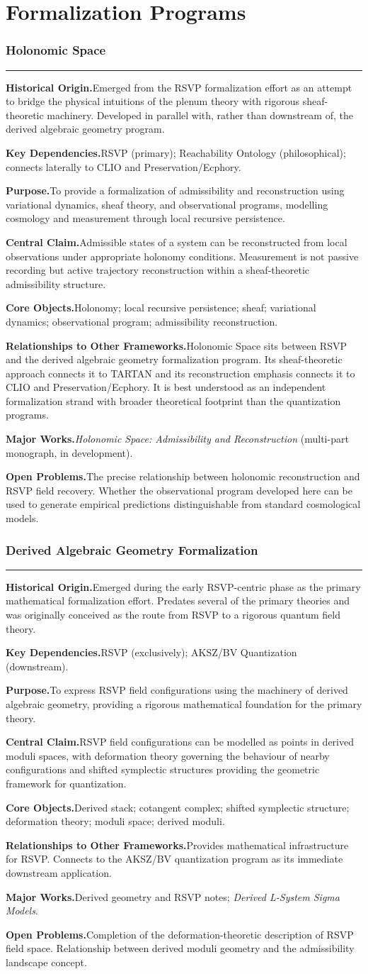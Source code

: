 \documentclass[12pt, twoside]{article}
\newcommand{\frameworkhead}[5]{  \subsubsection{#1}
  \noindent\textcolor{#2}{\rule{\linewidth}{0.8pt}}
  \smallskip

  \noindent\textbf{Historical Origin.}\quad #3

  \noindent\textbf{Key Dependencies.}\quad #4

  \noindent\textbf{Purpose.}\quad #5
}
\newcommand{\frameworkbody}[5]{  \noindent\textbf{Central Claim.}\quad #1

  \noindent\textbf{Core Objects.}\quad #2

  \noindent\textbf{Relationships to Other Frameworks.}\quad #3

  \noindent\textbf{Major Works.}\quad #4

  \noindent\textbf{Open Problems.}\quad #5
  \medskip
}
\begin{document}
\section{Formalization Programs}

\frameworkhead{Holonomic Space}{formalismgray}{Emerged from the RSVP formalization effort as an attempt to bridge the
physical intuitions of the plenum theory with rigorous sheaf-theoretic
machinery. Developed in parallel with, rather than downstream of, the
derived algebraic geometry program.}{RSVP (primary); Reachability Ontology (philosophical); connects laterally
to CLIO and Preservation/Ecphory.}{To provide a formalization of admissibility and reconstruction using
variational dynamics, sheaf theory, and observational programs, modelling
cosmology and measurement through local recursive persistence.}
\frameworkbody{Admissible states of a system can be reconstructed from local observations
under appropriate holonomy conditions. Measurement is not passive recording
but active trajectory reconstruction within a sheaf-theoretic admissibility
structure.}{Holonomy; local recursive persistence; sheaf; variational dynamics;
observational program; admissibility reconstruction.}{Holonomic Space sits between RSVP and the derived algebraic geometry
formalization program. Its sheaf-theoretic approach connects it to TARTAN
and its reconstruction emphasis connects it to CLIO and Preservation/Ecphory.
It is best understood as an independent formalization strand with broader
theoretical footprint than the quantization programs.}{\emph{Holonomic Space: Admissibility and Reconstruction} (multi-part
monograph, in development).}{The precise relationship between holonomic reconstruction and RSVP field
recovery. Whether the observational program developed here can be used to
generate empirical predictions distinguishable from standard cosmological
models.}

\frameworkhead{Derived Algebraic Geometry Formalization}{formalismgray}{Emerged during the early RSVP-centric phase as the primary mathematical
formalization effort. Predates several of the primary theories and was
originally conceived as the route from RSVP to a rigorous quantum field
theory.}{RSVP (exclusively); AKSZ/BV Quantization (downstream).}{To express RSVP field configurations using the machinery of derived algebraic
geometry, providing a rigorous mathematical foundation for the primary
theory.}
\frameworkbody{RSVP field configurations can be modelled as points in derived moduli
spaces, with deformation theory governing the behaviour of nearby
configurations and shifted symplectic structures providing the geometric
framework for quantization.}{Derived stack; cotangent complex; shifted symplectic structure; deformation
theory; moduli space; derived moduli.}{Provides mathematical infrastructure for RSVP. Connects to the AKSZ/BV
quantization program as its immediate downstream application.}{Derived geometry and RSVP notes; \emph{Derived L-System Sigma Models}.}{Completion of the deformation-theoretic description of RSVP field space.
Relationship between derived moduli geometry and the admissibility landscape
concept.}
\end{document}
